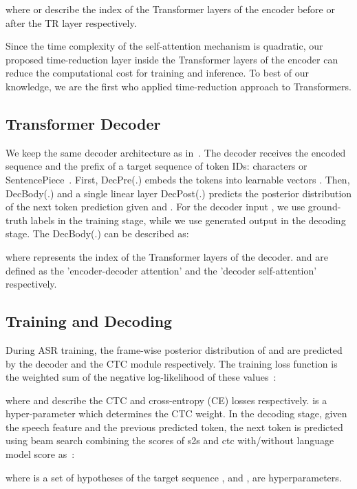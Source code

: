 \documentclass{article}
\begin{document}
where  or  describe the index of the Transformer layers of the encoder before or after the TR layer respectively.

Since the time complexity of the self-attention mechanism is quadratic, our proposed time-reduction layer inside the Transformer layers of the encoder can reduce the computational cost for training and inference. To best of our knowledge, we are the first who applied time-reduction approach to Transformers.  





\subsection{Transformer Decoder}
We keep the same decoder architecture as in~\citep{karita2019asru, karita2019is}. The decoder receives the encoded sequence  and the prefix of a target sequence  of token IDs: characters or SentencePiece~\citep{kudo2018sentencepiece}. First, DecPre(.) embeds the tokens into learnable vectors . Then, DecBody(.) and a single linear layer DecPost(.) predicts the posterior distribution of the next token prediction  given  and . For the decoder input , we use ground-truth labels in the training stage, while we use generated output in the decoding stage. The DecBody(.) can be described as:


where  represents the index of the Transformer layers of the decoder.  and  are defined as the  'encoder-decoder attention' and the 'decoder self-attention' respectively. 

\subsection{Training and Decoding}
During ASR training, the frame-wise posterior distribution of  and  are predicted by the decoder and the CTC module respectively. The training loss function is the weighted sum of the negative log-likelihood of these values~\citep{karita2019asru}:



where and  describe the CTC and cross-entropy (CE) losses respectively.  is a hyper-parameter which determines the CTC weight.    
In the decoding stage, given the speech feature  and the previous predicted token, the next token is predicted using beam search combining the scores of s2s and ctc with/without language model score as~\citep{karita2019asru}:


where is a set of hypotheses of the target sequence , and ,  are hyperparameters.
\end{document}
